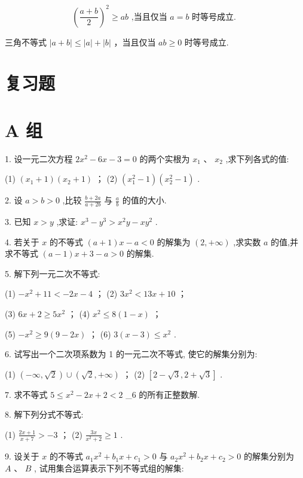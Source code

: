 \documentclass[10pt]{article}
\begin{document}
\[
{\left( \frac{a + b}{2}\right) }^{2} \geq  {ab}\text{ ,当且仅当 }a = b\text{ 时等号成立. }
\]

三角不等式 \(\left| {a + b}\right|  \leq  \left| a\right|  + \left| b\right|\) ，当且仅当 \({ab} \geq  0\) 时等号成立.

\section*{复习题}

\section*{A 组}

1. 设一元二次方程 \(2{x}^{2} - {6x} - 3 = 0\) 的两个实根为 \({x}_{1}\text{ 、 }{x}_{2}\) ,求下列各式的值:

(1) \(\left( {{x}_{1} + 1}\right) \left( {{x}_{2} + 1}\right)\) ； (2) \(\left( {{x}_{1}^{2} - 1}\right) \left( {{x}_{2}^{2} - 1}\right)\) .

2. 设 \(a > b > 0\) ,比较 \(\frac{b + {2a}}{a + {2b}}\) 与 \(\frac{a}{b}\) 的值的大小.

3. 已知 \(x > y\) ,求证: \({x}^{3} - {y}^{3} > {x}^{2}y - x{y}^{2}\) .

4. 若关于 \(x\) 的不等式 \(\left( {a + 1}\right) x - a < 0\) 的解集为 \(\left( {2, + \infty }\right)\) ,求实数 \(a\) 的值,并求不等式 \(\left( {a - 1}\right) x + 3 - a > 0\) 的解集.

5. 解下列一元二次不等式:

(1) \(- {x}^{2} + {11} <  - {2x} - 4\) ； (2) \(3{x}^{2} < {13x} + {10}\) ；

(3) \({6x} + 2 \geq  5{x}^{2}\) ； (4) \({x}^{2} \leq  8\left( {1 - x}\right)\) ；

(5) \(- {x}^{2} \geq  9\left( {9 - {2x}}\right)\) ； (6) \(3\left( {x - 3}\right)  \leq  {x}^{2}\) .

6. 试写出一个二次项系数为 1 的一元二次不等式, 使它的解集分别为:

(1) \(\left( {-\infty ,\sqrt{2}}\right)  \cup  \left( {\sqrt{2}, + \infty }\right)\) ； (2) \(\left\lbrack  {2 - \sqrt{3},2 + \sqrt{3}}\right\rbrack\) .

7. 求不等式 \(5 \leq  {x}^{2} - {2x} + 2 < 2\) \_6 的所有正整数解.

8. 解下列分式不等式:

(1) \(\frac{{2x} + 1}{x + 7} >  - 3\) ； (2) \(\frac{3x}{{x}^{2} + 2} \geq  1\) .

9. 设关于 \(x\) 的不等式 \({a}_{1}{x}^{2} + {b}_{1}x + {c}_{1} > 0\) 与 \({a}_{2}{x}^{2} + {b}_{2}x + {c}_{2} > 0\) 的解集分别为 \(A\text{ 、 }B\) , 试用集合运算表示下列不等式组的解集:
\end{document}

